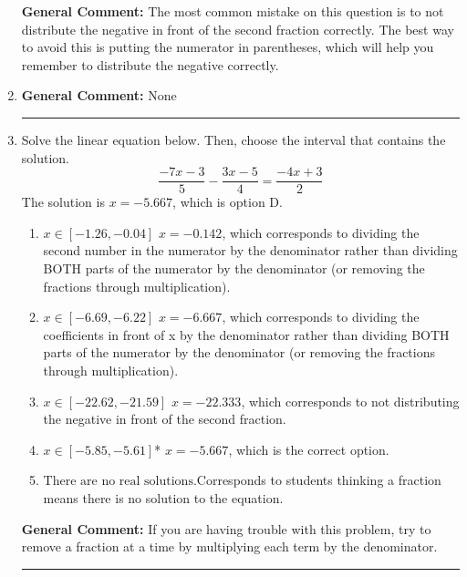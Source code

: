 \documentclass{extbook}[14pt]
\newcommand{\litem}[1]{\item#1\hspace*{-1cm}\rule{\textwidth}{0.4pt}}
\begin{document}
\begin{enumerate}
{\textbf{General Comment:} The most common mistake on this question is to not distribute the negative in front of the second fraction correctly. The best way to avoid this is putting the numerator in parentheses, which will help you remember to distribute the negative correctly.
}
\litem{



\textbf{General Comment:} None
}
\litem{
Solve the linear equation below. Then, choose the interval that contains the solution.
\[ \frac{-7x -3}{5} - \frac{3x -5}{4} = \frac{-4x + 3}{2} \]
The solution is \( x = -5.667 \), which is option D.\begin{enumerate}[label=\Alph*.]
\item \( x \in [-1.26, -0.04] \) $x = -0.142$, which corresponds to dividing the second number in the numerator by the denominator rather than dividing BOTH parts of the numerator by the denominator (or removing the fractions through multiplication).
\item \( x \in [-6.69, -6.22] \) $x = -6.667$, which corresponds to dividing the coefficients in front of x by the denominator rather than dividing BOTH parts of the numerator by the denominator (or removing the fractions through multiplication).
\item \( x \in [-22.62, -21.59] \) $x = -22.333$, which corresponds to not distributing the negative in front of the second fraction.
\item \( x \in [-5.85, -5.61] \)* $x = -5.667$, which is the correct option.
\item \( \text{There are no real solutions.} \)Corresponds to students thinking a fraction means there is no solution to the equation.
\end{enumerate}

\textbf{General Comment:} If you are having trouble with this problem, try to remove a fraction at a time by multiplying each term by the denominator.
}
\end{enumerate}
\end{document}
